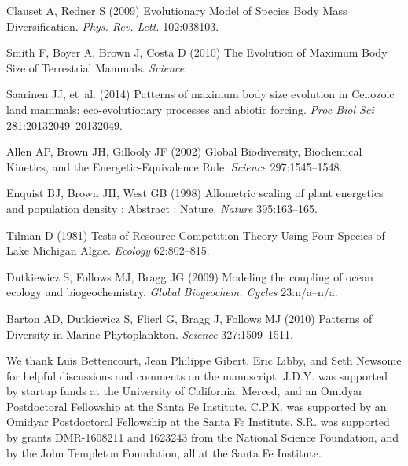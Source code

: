 \documentclass{pnastwo}
\begin{document}
\begin{article}
\begin{thebibliography}{10}
Clauset A, Redner S
\newblock (2009) {Evolutionary Model of Species Body Mass Diversification}.
\newblock \emph{Phys. Rev. Lett.} 102:038103.

Smith F, Boyer A, Brown J, Costa D
\newblock (2010) {The Evolution of Maximum Body Size of Terrestrial Mammals}.
\newblock \emph{Science}.

Saarinen JJ, {et~al.}
\newblock (2014) {Patterns of maximum body size evolution in Cenozoic land
  mammals: eco-evolutionary processes and abiotic forcing}.
\newblock \emph{Proc Biol Sci} 281:20132049--20132049.

Allen AP, Brown JH, Gillooly JF
\newblock (2002) {Global Biodiversity, Biochemical Kinetics, and the
  Energetic-Equivalence Rule}.
\newblock \emph{Science} 297:1545--1548.

Enquist BJ, Brown JH, West GB
\newblock (1998) {Allometric scaling of plant energetics and population density
  : Abstract : Nature}.
\newblock \emph{Nature} 395:163--165.

Tilman D
\newblock (1981) {Tests of Resource Competition Theory Using Four Species of
  Lake Michigan Algae}.
\newblock \emph{Ecology} 62:802--815.

Dutkiewicz S, Follows MJ, Bragg JG
\newblock (2009) {Modeling the coupling of ocean ecology and biogeochemistry}.
\newblock \emph{Global Biogeochem. Cycles} 23:n/a--n/a.

Barton AD, Dutkiewicz S, Flierl G, Bragg J, Follows MJ
\newblock (2010) {Patterns of Diversity in Marine Phytoplankton}.
\newblock \emph{Science} 327:1509--1511.

\end{thebibliography}



\begin{acknowledgments}
  We thank Luis Bettencourt, Jean Philippe Gibert, Eric Libby, and Seth Newsome for helpful
  discussions and comments on the manuscript.  J.D.Y. was supported by
  startup funds at the University of California, Merced, and an Omidyar
  Postdoctoral Fellowship at the Santa Fe Institute.  C.P.K. was supported by
  an Omidyar Postdoctoral Fellowship at the Santa Fe Institute.  S.R. was
  supported by grants DMR-1608211 and 1623243 from the National Science
  Foundation, and by the John Templeton Foundation, all at the Santa Fe
  Institute.
\end{acknowledgments}






\end{article}
\end{document}
